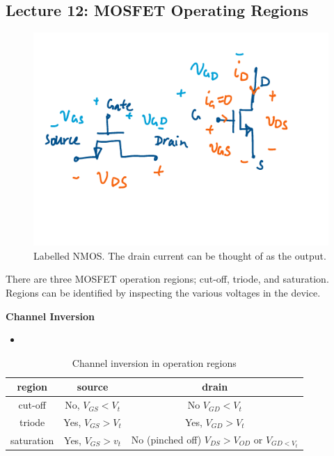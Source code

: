 \documentclass[../notes.tex]{subfiles}
\begin{document}
\subsection{Lecture 12: MOSFET Operating Regions}


\begin{figure}[H]
	\centering
	\includegraphics[width=0.8\linewidth]{img/image_2022-10-20-01-03-08.png}
	\caption{Labelled NMOS. The drain current can be thought of as the output.}
\end{figure}

There are three MOSFET operation regions; cut-off, triode, and saturation.
Regions can be identified by inspecting the various voltages in the device.


\textbf{Channel Inversion}  
\begin{itemize}
	\item 
\end{itemize}

\begin{table}[ht]
	\centering
	\caption{Channel inversion in operation regions}
	\begin{tabular}{|c|c|c|} 
		\hline
		region & source & drain \\ \hline
		cut-off & No, $ V_{GS}  < V_t $  & No $ V_{GD}  < V_t $  \\ \hline
		triode & Yes, $ V_{GS} > V_t  $  & Yes, $ V_{GD } > V_t $  \\ \hline
		saturation & Yes, $ V_{GS} > v_t $ & No (pinched off) $ V_{DS} > V_{OD} $ or $ V_{GD < V_t} $ \\ \hline
	\end{tabular}
\end{table}
\end{document}
